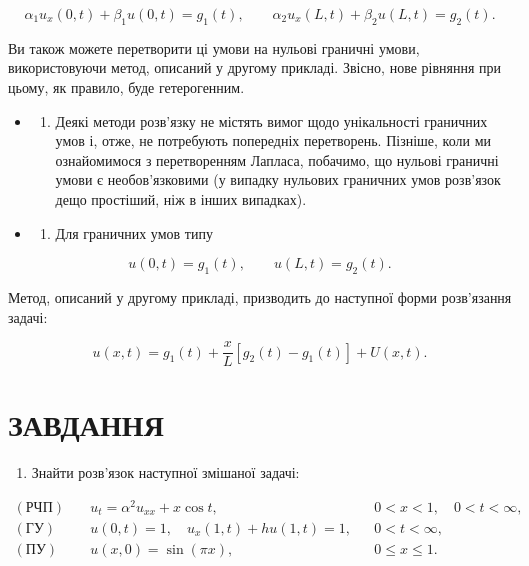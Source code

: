 \documentclass[
  ukrainian,
]{article}
\providecommand{\tightlist}{%
  \setlength{\itemsep}{0pt}\setlength{\parskip}{0pt}}
\begin{document}
\[
\alpha_1 u_x(0,t) + \beta_1 u(0,t) = g_1(t), \qquad \alpha_2 u_x(L,t) + \beta_2 u(L,t) = g_2(t).
\]

Ви також можете перетворити ці умови на нульові граничні умови,
використовуючи метод, описаний у другому прикладі. Звісно, нове рівняння
при цьому, як правило, буде гетерогенним.

\begin{itemize}
\tightlist
\item
  \begin{enumerate}
  \def\labelenumi{\arabic{enumi}.}
  \setcounter{enumi}{2}
  \tightlist
  \item
    Деякі методи розв'язку не містять вимог щодо унікальності граничних
    умов і, отже, не потребують попередніх перетворень. Пізніше, коли ми
    ознайомимося з перетворенням Лапласа, побачимо, що нульові граничні
    умови є необов'язковими (у випадку нульових граничних умов розв'язок
    дещо простіший, ніж в інших випадках).
  \end{enumerate}
\item
  \begin{enumerate}
  \def\labelenumi{\arabic{enumi}.}
  \setcounter{enumi}{3}
  \tightlist
  \item
    Для граничних умов типу
  \end{enumerate}
\end{itemize}

\[
u(0, t)=g_1(t), \qquad u(L, t)=g_2(t).
\]

Метод, описаний у другому прикладі, призводить до наступної форми
розв'язання задачі:

\[
u(x, t)=g_1(t)+\frac{x}{L}\left[g_2(t)-g_1(t)\right]+U(x, t).
\]

\section{ЗАВДАННЯ}\label{ux437ux430ux432ux434ux430ux43dux43dux44f-5}

\begin{enumerate}
\def\labelenumi{\arabic{enumi}.}
\tightlist
\item
  Знайти розв'язок наступної змішаної задачі:
\end{enumerate}

\[
\begin{aligned}
(\text{РЧП})\quad & u_t = \alpha^2 u_{xx} + x\cos t, && 0 < x < 1,\quad 0 < t < \infty, \\
(\text{ГУ})\quad & u(0,t) = 1,\quad u_x(1,t) + hu(1,t) = 1, && 0 < t < \infty, \\
(\text{ПУ})\quad & u(x,0) = \sin(\pi x), && 0 \leqslant x \leqslant 1.
\end{aligned}
\]
\end{document}
